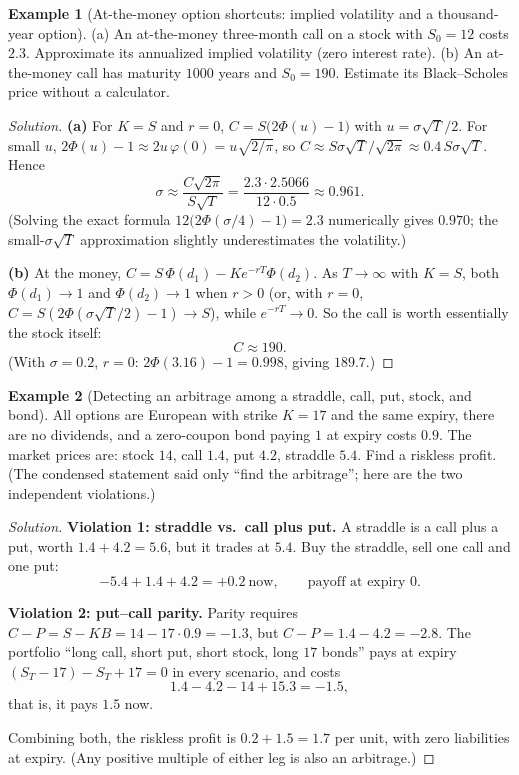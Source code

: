 \documentclass[11pt]{article}
\theoremstyle{definition}
\newtheorem{example}{Example}[section]
\begin{document}
\begin{example}[At-the-money option shortcuts: implied volatility and a thousand-year option]
(a) An at-the-money three-month call on a stock with $S_0=12$ costs $2.3$. Approximate its annualized implied volatility (zero interest rate). (b) An at-the-money call has maturity $1000$ years and $S_0=190$. Estimate its Black--Scholes price without a calculator.
\end{example}

\begin{proof}[Solution]
\textbf{(a)} For $K=S$ and $r=0$, $C=S\bigl(2\Phi(u)-1\bigr)$ with $u=\sigma\sqrt T/2$. For small $u$, $2\Phi(u)-1\approx2u\,\varphi(0)=u\sqrt{2/\pi}$, so $C\approx S\sigma\sqrt T/\sqrt{2\pi}\approx0.4\,S\sigma\sqrt T$. Hence
\[
\sigma\approx\frac{C\sqrt{2\pi}}{S\sqrt T}=\frac{2.3\cdot2.5066}{12\cdot0.5}\approx\boxed{0.961}.
\]
(Solving the exact formula $12\bigl(2\Phi(\sigma/4)-1\bigr)=2.3$ numerically gives $0.970$; the small-$\sigma\sqrt T$ approximation slightly underestimates the volatility.)

\textbf{(b)} At the money, $C=S\,\Phi(d_1)-Ke^{-rT}\Phi(d_2)$. As $T\to\infty$ with $K=S$, both $\Phi(d_1)\to1$ and $\Phi(d_2)\to1$ when $r>0$ (or, with $r=0$, $C=S(2\Phi(\sigma\sqrt T/2)-1)\to S$), while $e^{-rT}\to0$. So the call is worth essentially the stock itself:
\[
C\approx\boxed{190}.
\]
(With $\sigma=0.2$, $r=0$: $2\Phi(3.16)-1=0.998$, giving $189.7$.)
\end{proof}

\begin{example}[Detecting an arbitrage among a straddle, call, put, stock, and bond]
All options are European with strike $K=17$ and the same expiry, there are no dividends, and a zero-coupon bond paying $1$ at expiry costs $0.9$. The market prices are: stock $14$, call $1.4$, put $4.2$, straddle $5.4$. Find a riskless profit. (The condensed statement said only ``find the arbitrage''; here are the two independent violations.)
\end{example}

\begin{proof}[Solution]
\textbf{Violation 1: straddle vs.\ call plus put.} A straddle is a call plus a put, worth $1.4+4.2=5.6$, but it trades at $5.4$. Buy the straddle, sell one call and one put:
\[
-5.4+1.4+4.2=+0.2\ \text{now},\qquad\text{payoff at expiry }0.
\]

\textbf{Violation 2: put--call parity.} Parity requires $C-P=S-KB=14-17\cdot0.9=-1.3$, but $C-P=1.4-4.2=-2.8$. The portfolio ``long call, short put, short stock, long $17$ bonds'' pays at expiry $(S_T-17)-S_T+17=0$ in every scenario, and costs
\[
1.4-4.2-14+15.3=-1.5,
\]
that is, it pays $1.5$ now.

Combining both, the riskless profit is $0.2+1.5=\boxed{1.7}$ per unit, with zero liabilities at expiry. (Any positive multiple of either leg is also an arbitrage.)
\end{proof}
\end{document}
